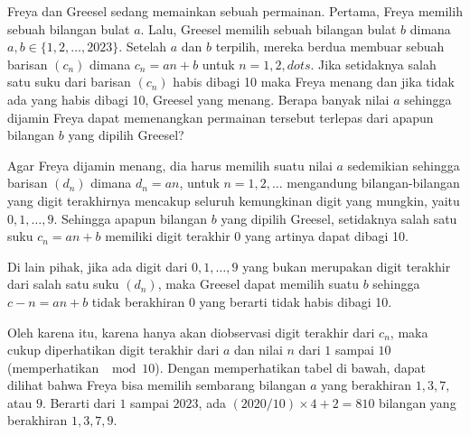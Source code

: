 \documentclass[11pt]{scrartcl}
\begin{document}
\begin{soaljawab}
    Freya dan Greesel sedang memainkan sebuah permainan. Pertama, Freya memilih sebuah bilangan bulat $a$. Lalu, Greesel memilih sebuah bilangan bulat $b$ dimana $a,b \in \{1,2,\dots,2023\}$. Setelah $a$ dan $b$ terpilih, mereka berdua membuar sebuah barisan $(c_n)$ dimana $c_n = an + b$ untuk $n = 1,2,dots$. Jika setidaknya salah satu suku dari barisan $(c_n)$ habis dibagi 10 maka Freya menang dan jika tidak ada yang habis dibagi 10, Greesel yang menang. Berapa banyak nilai $a$ sehingga dijamin Freya dapat memenangkan permainan tersebut terlepas dari apapun bilangan $b$ yang dipilih Greesel?
    
    \begin{solusi}
        Agar Freya dijamin menang, dia harus memilih suatu nilai $a$ sedemikian sehingga barisan $(d_n)$ dimana $d_n=an$, untuk $n=1,2,\dots$ mengandung bilangan-bilangan yang digit terakhirnya mencakup seluruh kemungkinan digit yang mungkin, yaitu $0,1,\dots,9$. Sehingga apapun bilangan $b$ yang dipilih Greesel, setidaknya salah satu suku $c_n = an+b$ memiliki digit terakhir $0$ yang artinya dapat dibagi 10. 

        Di lain pihak, jika ada digit dari $0,1,\dots,9$ yang bukan merupakan digit terakhir dari salah satu suku $(d_n)$, maka Greesel dapat memilih suatu $b$ sehingga $c-n=an+b$ tidak berakhiran $0$ yang berarti tidak habis dibagi 10. 
        
        Oleh karena itu, karena hanya akan diobservasi digit terakhir dari $c_n$, maka cukup diperhatikan digit terakhir dari $a$ dan nilai $n$ dari $1$ sampai $10$ (memperhatikan $\mod 10$). Dengan memperhatikan tabel di bawah, dapat dilihat bahwa Freya bisa memilih sembarang bilangan $a$ yang berakhiran $1,3,7$, atau $9$. Berarti dari $1$ sampai $2023$, ada $(2020/10) \times 4 + 2 = \boxed{810}$ bilangan yang berakhiran $1,3,7,9$.



\end{solusi}
\end{soaljawab}
\end{document}
